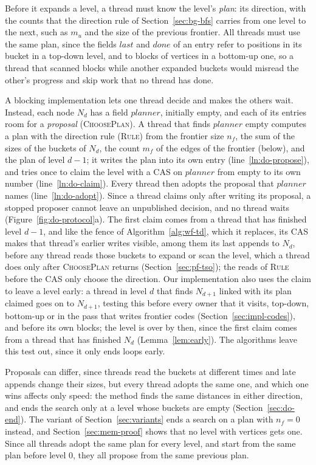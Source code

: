 Before it expands a level, a thread must know the level's \emph{plan}: its direction, with the counts that the direction rule of Section~\ref{sec:bg-bfs} carries from one level to the next, such as $m_u$ and the size of the previous frontier. All threads must use the same plan, since the fields $\mathit{last}$ and $\mathit{done}$ of an entry refer to positions in its bucket in a top-down level, and to blocks of vertices in a bottom-up one, so a thread that scanned blocks while another expanded buckets would misread the other's progress and skip work that no thread has done.

A blocking implementation lets one thread decide and makes the others wait. Instead, each node $N_d$ has a field $\mathit{planner}$, initially empty, and each of its entries room for a \emph{proposal} (\textsc{ChoosePlan}). A thread that finds $\mathit{planner}$ empty computes a plan with the direction rule (\textsc{Rule}) from the frontier size $n_f$, the sum of the sizes of the buckets of $N_d$, the count $m_f$ of the edges of the frontier (below), and the plan of level $d-1$; it writes the plan into its own entry (line~\ref{ln:do-propose}), and tries once to claim the level with a CAS on $\mathit{planner}$ from empty to its own number (line~\ref{ln:do-claim}). Every thread then adopts the proposal that $\mathit{planner}$ names (line~\ref{ln:do-adopt}). Since a thread claims only after writing its proposal, a stopped proposer cannot leave an unpublished decision, and no thread waits (Figure~\ref{fig:do-protocol}a). The first claim comes from a thread that has finished level $d-1$, and like the fence of Algorithm~\ref{alg:wf-td}, which it replaces, its CAS makes that thread's earlier writes visible, among them its last appends to $N_d$, before any thread reads those buckets to expand or scan the level, which a thread does only after \textsc{ChoosePlan} returns (Section~\ref{sec:pf-tso}); the reads of \textsc{Rule} before the CAS only choose the direction. Our implementation also uses the claim to leave a level early: a thread in level $d$ that finds $N_{d+1}$ linked with its plan claimed goes on to $N_{d+1}$, testing this before every owner that it visits, top-down, bottom-up or in the pass that writes frontier codes (Section~\ref{sec:impl-codes}), and before its own blocks; the level is over by then, since the first claim comes from a thread that has finished $N_d$ (Lemma~\ref{lem:early}). The algorithms leave this test out, since it only ends loops early.

Proposals can differ, since threads read the buckets at different times and late appends change their sizes, but every thread adopts the same one, and which one wins affects only speed: the method finds the same distances in either direction, and ends the search only at a level whose buckets are empty (Section~\ref{sec:do-end}). The variant of Section~\ref{sec:variants} ends a search on a plan with $n_f = 0$ instead, and Section~\ref{sec:mem-proof} shows that no level with vertices gets one. Since all threads adopt the same plan for every level, and start from the same plan before level 0, they all propose from the same previous plan.

